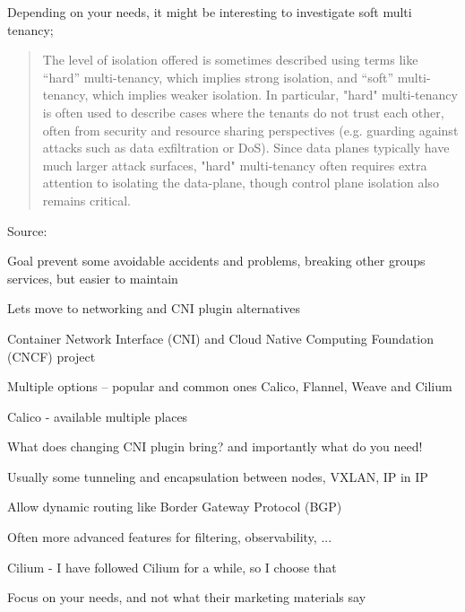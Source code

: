 \documentclass[Screen16to9,17pt]{foils}
\begin{document}

Depending on your needs, it might be interesting to investigate soft multi tenancy;

\begin{quote}
The level of isolation offered is sometimes described using terms like “hard” multi-tenancy, which implies strong isolation, and “soft” multi-tenancy, which implies weaker isolation. In particular, "hard" multi-tenancy is often used to describe cases where the tenants do not trust each other, often from security and resource sharing perspectives (e.g. guarding against attacks such as data exfiltration or DoS). Since data planes typically have much larger attack surfaces, "hard" multi-tenancy often requires extra attention to isolating the data-plane, though control plane isolation also remains critical.
\end{quote}
Source: 


Goal prevent some avoidable accidents and problems, breaking other groups services, but easier to maintain



Lets move to networking and CNI plugin alternatives

\begin{list2}
\item Container Network Interface (CNI) and Cloud Native Computing Foundation (CNCF) project\\
\item Multiple options -- popular and common ones Calico, Flannel, Weave and Cilium
\item Calico - available multiple places
\item What does changing CNI plugin bring? and importantly what do you need!
\item Usually some tunneling and encapsulation between nodes, VXLAN, IP in IP
\item Allow dynamic routing like Border Gateway Protocol (BGP)
\item Often more advanced features for filtering, observability, ...
\item Cilium - I have followed Cilium for a while, so I choose that
\end{list2}

Focus on your needs, and not what their marketing materials say
\end{document}
